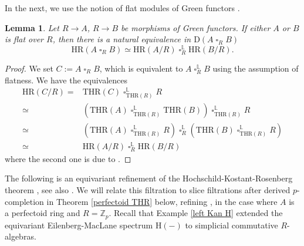 \documentclass[10pt]{amsart}
\newtheorem{lem}[thm]{Lemma}
\theoremstyle{definition}
\numberwithin{equation}{section}
\renewcommand{\L}{\mathbb{L}}
\newcommand{\Z}{\mathbb{Z}}
\newcommand{\rD}{\mathrm{D}}
\newcommand{\rH}{\mathrm{H}}
\DeclareMathOperator{\sotimes}{\square}
\newcommand{\HR}{\mathrm{HR}}
\newcommand{\THR}{\mathrm{THR}}
\begin{document}
In the next,
we use the notion of flat modules of Green functors \cite[Definition A.5.1]{HP23}.

\begin{lem}
\label{monoidal HR}
Let $R\to A$, $R \to B$ be morphisms of Green functors.
If either $A$ or $B$ is flat over $R$,
then there is a natural equivalence
in $\rD(A\sotimes_R B)$
\[
\HR(A\sotimes_R B)
\simeq
\HR(A/R)
\sotimes_{R}^\L \HR(B/R).
\]
\end{lem}
\begin{proof}
We set $C:=A\sotimes_R B$, which is equivalent to $A\sotimes_R^\L B$ using the assumption of flatness.
We have the equivalences
\begin{align*}
\HR(C/R)
= &
\THR(C)
\sotimes_{\THR(R)}^\L
R
\\
\simeq &
(\THR(A)\sotimes_{\THR(R)}^\L\THR(B))
\sotimes_{\THR(R)}^\L
R
\\
\simeq &
(\THR(A)\sotimes_{\THR(R)}^\L R)
\sotimes_{R}^\L
(\THR(B)\sotimes^\L_{\THR(R)} R)
\\
\simeq &
\HR(A/R)\sotimes_{R}^\L\HR(B/R)
\end{align*}
where the second one is due to \cite[Proposition 2.1.5]{HP23}. 
\end{proof}





The following is an equivariant refinement of the Hochschild-Kostant-Rosenberg theorem \cite{HKR},
see also \cite[p.\ 215]{BMS19}.
We will relate this filtration to slice filtrations after derived $p$-completion in Theorem \ref{perfectoid THR} below,
refining \cite[Theorem 6.1]{BMS19}, in the case where $A$ is a perfectoid ring and $R=\Z_p$.
Recall that Example \ref{left Kan H} extended the equivariant Eilenberg-MacLane spectrum $\rH(-)$ to simplicial commutative $R$-algebras.
\end{document}
